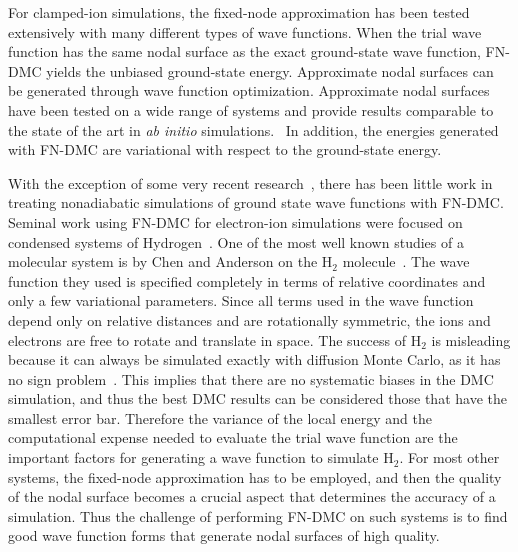\documentclass[aip,jcp,numerical,reprint]{revtex4-1}
\begin{document}
For clamped-ion simulations, the fixed-node approximation has been tested extensively with many different types of wave functions.  When the trial wave function has the same nodal surface as the exact ground-state wave function, FN-DMC yields the unbiased ground-state energy.  Approximate nodal surfaces can be generated through wave function optimization.  Approximate nodal surfaces have been tested on a wide range of systems and provide results comparable to the state of the art in \textit{ab initio} simulations.~\cite{Stuart_Review,rothstein1,grossman1,Yang2015,Tubman_Release} In addition, the energies generated with FN-DMC are variational with respect to the ground-state energy.


With the exception of some very recent research~\cite{Tubman_ECG,Yang2015}, there has been little work in treating nonadiabatic simulations of ground state wave functions with FN-DMC. Seminal work using FN-DMC for electron-ion simulations were focused on condensed systems of Hydrogen~\cite{Ceperley_1987,Natoli_1993,Natoli_1995}.  One of the most well known studies of a molecular system is by Chen and Anderson   on  the H$_{2}$ molecule~\cite{chen1995}. %
  The wave function they used is specified completely in terms of relative coordinates and only a few variational parameters. Since all terms used in the wave function depend only on relative distances and are rotationally symmetric, the ions and electrons are free to rotate and translate in space. 
The success of H$_{2}$ is misleading because it can always be simulated exactly with diffusion Monte Carlo, as it has no sign problem~\cite{Tubman_Release}.  This implies that there are no systematic biases in the DMC simulation, and thus the best DMC results can be considered those that have the smallest error bar.  Therefore the variance of the local energy and the computational expense needed to evaluate the trial wave function are the important factors for generating a wave function to simulate H$_{2}$.  For most other systems, the fixed-node approximation has to be employed, and then the quality of the nodal surface becomes a crucial aspect that determines the accuracy of a simulation.  Thus the challenge of performing FN-DMC on such systems is to find good wave function forms that generate nodal surfaces of high quality.
\end{document}
